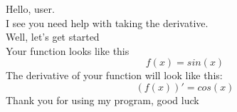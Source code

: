 \documentclass{article}
\begin{document}
Hello, user.\\
I see you need help with taking the derivative.\\
Well, let's get started\\
Your function looks like this\\
\[
f(x) = sin(x)
\]
The derivative of your function will look like this:\\
\[
(f(x))' = cos(x)
\]
Thank you for using my program, good luck\\
\end{document}
